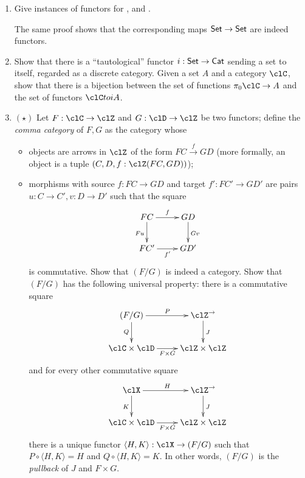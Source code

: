 \documentclass[11pt]{article}
\begin{document}
\footnotesize
\begin{enumerate}
	\item Give instances of functors for ,  and .

	The same proof shows that the corresponding maps $\mathsf{Set} \to \mathsf{Set}$ are indeed functors.
	\item Show that there is a ``tautological'' functor $i : \mathsf{Set} \to \sf Cat$ sending a set to itself, regarded as a discrete category. Given a set $A$ and a category $\clC$, show that there is a bijection between the set of functions $\pi_0\clC \to A$ and the set of functors $\clC to iA$.
	\item $(\star)$ Let $F : \clC\to\clZ$ and $G :\clD\to\clZ$ be two functors; define the \emph{comma category} of $F,G$ as the category whose
	\begin{itemize}
		\item objects are arrows in $\clZ$ of the form $FC \xrightarrow{f} GD$ (more formally, an object is a tuple $(C,D, f:\clZ(FC,GD))$);
		\item morphisms with source $f :FC \to GD$ and target $f' : FC'\to GD'$ are pairs $u:C\to C', v:D\to D'$ such that the square 
		\[\vcenter{\xymatrix{
			FC \ar[r]^f \ar[d]_{Fu}& GD \ar[d]^{Gv}\\
			FC'\ar[r]_{f'} & GD'
		}}\] is commutative. Show that $(F/G)$ is indeed a category. Show that $(F/G)$ has the following universal property: there is a commutative square 
		\[\vcenter{\xymatrix{
			(F/G) \ar[r]^P\ar[d]_Q &  \clZ^\to \ar[d]^J \\
			\clC\times\clD \ar[r]_{F\times G} & \clZ\times \clZ
		}}\]
		and for every other commutative square 
		\[\vcenter{\xymatrix{
			\clX \ar[r]^H\ar[d]_K &  \clZ^\to \ar[d]^J \\
			\clC\times\clD \ar[r]_{F\times G} & \clZ\times \clZ
		}}\]
		there is a unique functor $\langle H,K\rangle : \clX \to (F/G)$ such that $P\circ \langle H,K\rangle = H$ and $Q\circ \langle H,K\rangle = K$. In other words, $(F/G)$ is the \emph{pullback} of $J$ and $F\times G$.
	\end{itemize}
\end{enumerate}
\end{document}
